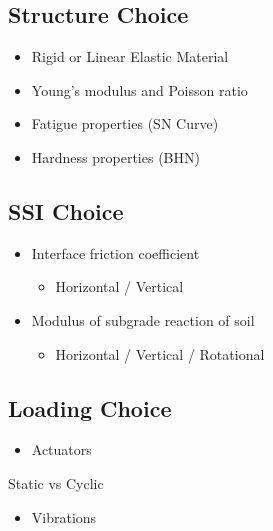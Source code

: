 \documentclass[
  letterpaper,
  DIV=11,
  numbers=noendperiod]{scrreprt}
\providecommand{\tightlist}{%
  \setlength{\itemsep}{0pt}\setlength{\parskip}{0pt}}\usepackage{longtable,booktabs,array}
\begin{document}
\hypertarget{structure-choice}{%
\subsection{Structure Choice}\label{structure-choice}}

\begin{itemize}
\tightlist
\item
  Rigid or Linear Elastic Material
\item
  Young's modulus and Poisson ratio
\item
  Fatigue properties (SN Curve)
\item
  Hardness properties (BHN)
\end{itemize}

\hypertarget{ssi-choice}{%
\subsection{SSI Choice}\label{ssi-choice}}

\begin{itemize}
\tightlist
\item
  Interface friction coefficient

  \begin{itemize}
  \tightlist
  \item
    Horizontal / Vertical
  \end{itemize}
\item
  Modulus of subgrade reaction of soil

  \begin{itemize}
  \tightlist
  \item
    Horizontal / Vertical / Rotational
  \end{itemize}
\end{itemize}

\hypertarget{loading-choice}{%
\subsection{Loading Choice}\label{loading-choice}}

\begin{itemize}
\tightlist
\item
  Actuators
\end{itemize}

Static vs Cyclic

\begin{itemize}
\tightlist
\item
  Vibrations
\end{itemize}
\end{document}
